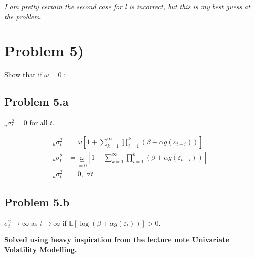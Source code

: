 \documentclass{EconHomework}
\begin{document}
\bigskip

\textit{I am pretty certain the second case for l is incorrect, but this is my best guess at the problem.}

\section{Problem 5)}

Show that if $\omega=0$ : 

\subsection{Problem 5.a }

\begin{tcolorbox}[colback=white]
    $_{u}\sigma_{t}^{2}=0$ for all $t$. 
\end{tcolorbox}


\begin{align*}
_{u}\sigma_{t}^{2} & =\omega\left[1+\sum_{k=1}^{\infty}\prod_{i=1}^{k}\left(\beta+\alpha g\left(\varepsilon_{t-i}\right)\right)\right]\\
_{u}\sigma_{t}^{2} & =\underbrace{\omega}_{=0}\left[1+\sum_{k=1}^{\infty}\prod_{i=1}^{k}\left(\beta+\alpha g\left(\varepsilon_{t-i}\right)\right)\right]\\
_{u}\sigma_{t}^{2} & =0,\;\forall t
\end{align*}

\pagebreak

\subsection{Problem 5.b}

\begin{tcolorbox}[colback=white]
$\sigma_{t}^{2}\rightarrow\infty$ as $t\rightarrow\infty$ if $\mathbb{E}\left[\log\left(\beta+\alpha g\left(\varepsilon_{t}\right)\right)\right]>0$.
\end{tcolorbox}

\textbf{Solved using heavy inspiration from the lecture note Univariate Volatility Modelling.}

\bigskip
\end{document}
